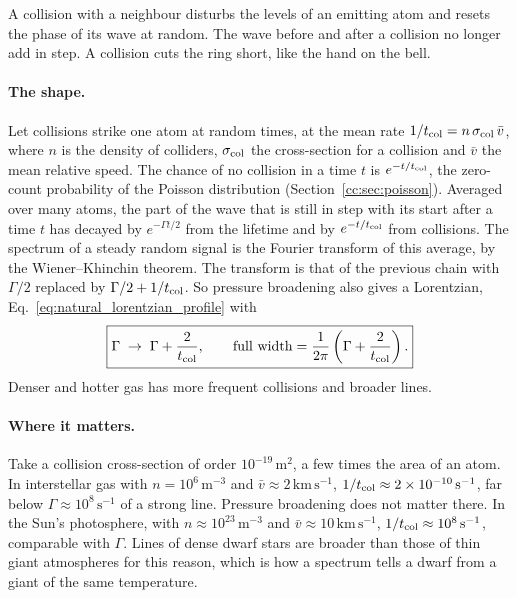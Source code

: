A collision with a neighbour disturbs the levels of an emitting atom and resets the phase of its wave at random. The wave before and after a collision no longer add in step. A collision cuts the ring short, like the hand on the bell.

\paragraph{The shape.} Let collisions strike one atom at random times, at the mean rate $1/t_{\rm col}=n\,\sigma_{\rm col}\,\bar v$, where $n$ is the density of colliders, $\sigma_{\rm col}$ the cross-section for a collision and $\bar v$ the mean relative speed. The chance of no collision in a time $t$ is $e^{-t/t_{\rm col}}$, the zero-count probability of the Poisson distribution (Section~\ref{cc:sec:poisson}). Averaged over many atoms, the part of the wave that is still in step with its start after a time $t$ has decayed by $e^{-\Gamma t/2}$ from the lifetime and by $e^{-t/t_{\rm col}}$ from collisions. The spectrum of a steady random signal is the Fourier transform of this average, by the Wiener--Khinchin theorem. The transform is that of the previous chain with $\Gamma/2$ replaced by $\Gamma/2+1/t_{\rm col}$. So pressure broadening also gives a Lorentzian, Eq.~\eqref{eq:natural_lorentzian_profile} with
\begin{equation}
	\boxed{\Gamma\;\to\;\Gamma+\frac{2}{t_{\rm col}},\qquad \text{full width}=\frac{1}{2\pi}\left(\Gamma+\frac{2}{t_{\rm col}}\right).}
	\label{is:eq:pressure_width}
\end{equation}
Denser and hotter gas has more frequent collisions and broader lines.

\paragraph{Where it matters.} Take a collision cross-section of order $10^{-19}\,\mathrm{m^2}$, a few times the area of an atom. In interstellar gas with $n=10^6\,\mathrm{m^{-3}}$ and $\bar v\approx2\,\mathrm{km\,s^{-1}}$, $1/t_{\rm col}\approx2\times10^{-10}\,\mathrm{s^{-1}}$, far below $\Gamma\approx10^8\,\mathrm{s^{-1}}$ of a strong line. Pressure broadening does not matter there. In the Sun's photosphere, with $n\approx10^{23}\,\mathrm{m^{-3}}$ and $\bar v\approx10\,\mathrm{km\,s^{-1}}$, $1/t_{\rm col}\approx10^8\,\mathrm{s^{-1}}$, comparable with $\Gamma$. Lines of dense dwarf stars are broader than those of thin giant atmospheres for this reason, which is how a spectrum tells a dwarf from a giant of the same temperature.

